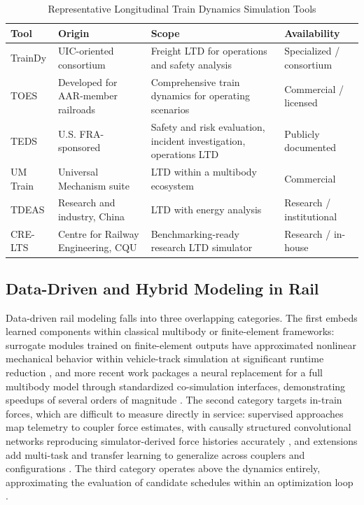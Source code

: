 \documentclass[numbered]{trbunofficial}
\begin{document}
\begin{table}[!ht]
  \caption{Representative Longitudinal Train Dynamics Simulation Tools}\label{tab:ltd_tools}
  \begin{center}
  \small
  \begin{tabular}{@{}p{2.1cm}p{3.3cm}p{5.2cm}p{2.6cm}@{}}
    \hline
    Tool & Origin & Scope & Availability \\
    \hline
    TrainDy \citep{Cantone2008TrainDy} & UIC-oriented consortium & Freight LTD for operations and safety analysis & Specialized / consortium \\
    TOES & Developed for AAR-member railroads \citep{WheelRail2018TOES} & Comprehensive train dynamics for operating scenarios & Commercial / licensed \\
    TEDS \citep{FRA2019TEDSProject} & U.S. FRA-sponsored & Safety and risk evaluation, incident investigation, operations LTD & Publicly documented \\
    UM Train \citep{UMTrainPlugin} & Universal Mechanism suite & LTD within a multibody ecosystem & Commercial \\
    TDEAS \citep{Wei2014TDEAS} & Research and industry, China & LTD with energy analysis & Research / institutional \\
    CRE-LTS \citep{Spiryagin2017BenchmarkQuestions} & Centre for Railway Engineering, CQU & Benchmarking-ready research LTD simulator & Research / in-house \\
    \hline
  \end{tabular}
  \end{center}
\end{table}

\subsection{Data-Driven and Hybrid Modeling in Rail}

Data-driven rail modeling falls into three overlapping categories. The first embeds learned components within classical multibody or finite-element frameworks: surrogate modules trained on finite-element outputs have approximated nonlinear mechanical behavior within vehicle-track simulation at significant runtime reduction \citep{nie_data_driven_dynamics}, and more recent work packages a neural replacement for a full multibody model through standardized co-simulation interfaces, demonstrating speedups of several orders of magnitude \citep{zhou_surrogate_integration}. The second category targets in-train forces, which are difficult to measure directly in service: supervised approaches map telemetry to coupler force estimates, with causally structured convolutional networks reproducing simulator-derived force histories accurately \citep{zhang_in_train_forces}, and extensions add multi-task and transfer learning to generalize across couplers and configurations \citep{intrainnet}. The third category operates above the dynamics entirely, approximating the evaluation of candidate schedules within an optimization loop \citep{liu_rescheduling_surrogate}.
\end{document}
